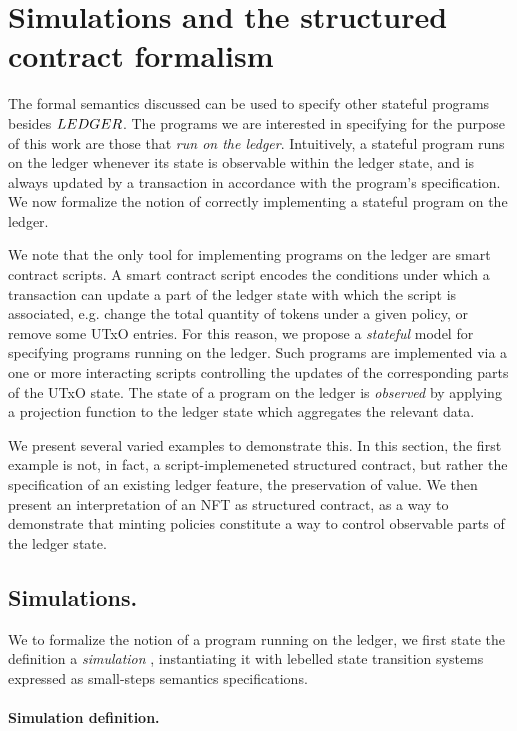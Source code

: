\section{Simulations and the structured contract formalism}
\label{sec:struc}

The formal semantics discussed can be used to specify other stateful programs
besides $\LEDGER$. The programs we are interested in specifying for the purpose of this work
are those that \emph{run on the ledger}. Intuitively, a stateful program runs on the
ledger whenever its state is observable within the ledger state, and is always
updated by a transaction in accordance with the program's specification.
We now formalize the notion of correctly implementing
a stateful program on the ledger.

We note that the only tool for implementing programs on the ledger are smart
contract scripts. A smart contract script encodes the conditions under which
a transaction can update a part of the ledger state with which the script is
associated, e.g. change the total quantity of tokens under a given policy, or
remove some UTxO entries. For this reason,
we propose a \emph{stateful} model for specifying programs running on the
ledger. Such programs are implemented via a one or more
interacting scripts controlling the updates of the corresponding parts of the UTxO state.
The state of a program on the ledger is \emph{observed} by applying a projection
function to the ledger state which aggregates the relevant data.

We present several varied examples to demonstrate this.
In this section, the first example is not, in fact, a script-implemeneted structured
contract, but rather the specification of an existing ledger feature, the preservation
of value. We then present an interpretation of an NFT as structured contract,
as a way to demonstrate that minting policies constitute
a way to control observable parts of the ledger state.

\subsection{Simulations.}

We to formalize the notion of a program running on the ledger, we first state the
definition a \emph{simulation} \cite{milner-pibook}, instantiating it with lebelled
state transition systems expressed as small-steps semantics specifications.

\paragraph{Simulation definition.}
\label{def:simulation}

